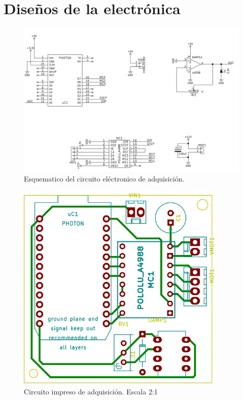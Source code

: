 \documentclass[12pt,a4paper]{article}
\begin{document}
    \section{Diseños de la electrónica}
    \vfill
    \begin{figure}[H]
    \centering
    \includegraphics[width=15cm]{fig/circuito/circuito_esquematico}
    \caption{Esquematico del circuito eléctronico de adquisición.}
    \label{fig:circuito/esquematico}
    \end{figure}
    \vfill
    \begin{figure}[H]
    \centering
    \includegraphics[width=10cm]{fig/circuito/circuito_pcb}
    \caption{Circuito impreso de adquisición. Escala 2:1}
    \label{fig:circuito/pcb}
    \end{figure}
    \vfill
\end{document}
